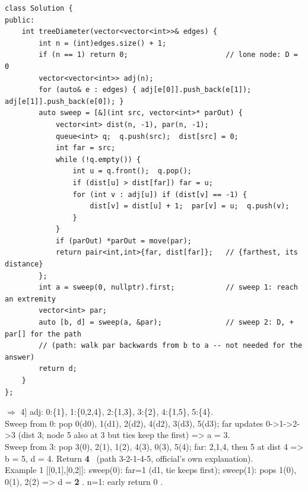 \begin{lstlisting}[caption={LeetCode 1245 -- two BFS sweeps over the edge-list adjacency}, label={lst:c09-1245-soln}]
class Solution {
public:
    int treeDiameter(vector<vector<int>>& edges) {
        int n = (int)edges.size() + 1;
        if (n == 1) return 0;                       // lone node: D = 0
        vector<vector<int>> adj(n);
        for (auto& e : edges) { adj[e[0]].push_back(e[1]); adj[e[1]].push_back(e[0]); }
        auto sweep = [&](int src, vector<int>* parOut) {
            vector<int> dist(n, -1), par(n, -1);
            queue<int> q;  q.push(src);  dist[src] = 0;
            int far = src;
            while (!q.empty()) {
                int u = q.front();  q.pop();
                if (dist[u] > dist[far]) far = u;
                for (int v : adj[u]) if (dist[v] == -1) {
                    dist[v] = dist[u] + 1;  par[v] = u;  q.push(v);
                }
            }
            if (parOut) *parOut = move(par);
            return pair<int,int>{far, dist[far]};   // {farthest, its distance}
        };
        int a = sweep(0, nullptr).first;            // sweep 1: reach an extremity
        vector<int> par;
        auto [b, d] = sweep(a, &par);               // sweep 2: D, + par[] for the path
        // (path: walk par backwards from b to a -- not needed for the answer)
        return d;
    }
};
\end{lstlisting}

\begin{tracebox}[Official Example 2: edges [0-1,1-2,2-3,1-4,4-5] $\Rightarrow$ 4]
adj: 0:\{1\}, 1:\{0,2,4\}, 2:\{1,3\}, 3:\{2\}, 4:\{1,5\}, 5:\{4\}.\\
Sweep from 0: pop 0(d0), 1(d1), 2(d2), 4(d2), 3(d3), 5(d3); far updates 0->1->2->3
(dist 3; node 5 also at 3 but ties keep the first) => a = 3.\\
Sweep from 3: pop 3(0), 2(1), 1(2), 4(3), 0(3), 5(4); far: 2,1,4, then 5 at dist 4
=> b = 5, d = 4. Return \textbf{4} \checkmark\ (path 3-2-1-4-5, official's own
explanation).\\
Example 1 [[0,1],[0,2]]: sweep(0): far=1 (d1, tie keeps first); sweep(1): pops 1(0),
0(1), 2(2) => d = \textbf{2} \checkmark. n=1: early return 0 \checkmark.
\end{tracebox}


